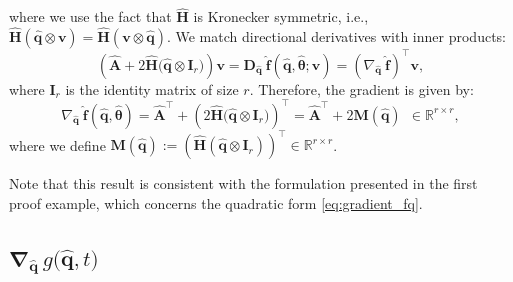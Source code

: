 where we use the fact that $\hat{\mathbf{H}}$ is Kronecker symmetric, i.e., $\hat{\mathbf{H}}(\hat{\mathbf{q}} \otimes \mathbf{v}) = \hat{\mathbf{H}}(\mathbf{v} \otimes \hat{\mathbf{q}})$.
We match directional derivatives with inner products:\\
$$
\left( \hat{\mathbf{A}} + 2\hat{\mathbf{H}}\bigl( \hat{\mathbf{q}} \otimes \mathbf{I}_r \bigr) \right) \mathbf{v} = \bm{D}_{\hat{\mathbf{q}}}~\hat{\mathbf{f}}(\hat{\mathbf{q}},\hat{\bm{\theta}};\mathbf{v}) = \left( \nabla_{\hat{\mathbf{q}}}~\hat{\mathbf{f}} \right)^{\top}  \mathbf{v},
$$
where $\mathbf{I}_r$ is the identity matrix of size $r$. Therefore, the gradient is given by:\\
\begin{equation}
    \nabla_{\hat{\mathbf{q}}}~\hat{\mathbf{f}}(\hat{\mathbf{q}}, \hat{\bm{\theta}}) = \hat{\mathbf{A}}^{\top} + \left( 2\hat{\mathbf{H}}\bigl( \hat{\mathbf{q}} \otimes \mathbf{I}_r \bigr) \right)^{\top} = \hat{\mathbf{A}}^{\top} + 2\mathbf{M}(\hat{\mathbf{q}}) ~~ \in \mathbb{R}^{r \times r},
    \label{eq:gradient_1}
\end{equation}
where we define $\mathbf{M}(\hat{\mathbf{q}}) := \left( \hat{\mathbf{H}}( \hat{\mathbf{q}} \otimes \mathbf{I}_r ) \right)^{\top} \in \mathbb{R}^{r \times r}$.

Note that this result is consistent with the formulation presented in the first proof example, which concerns the quadratic form \eqref{eq:gradient_fq}.


\subsection{$\bm{\nabla}_{\hat{\mathbf{q}}}\,g\bigl(\hat{\mathbf{q}},t\bigr)$}

